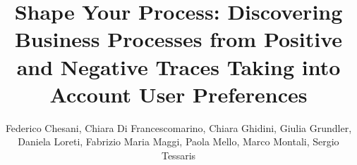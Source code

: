 \documentclass[runningheads]{llncs}
\begin{document}
%
\title{Shape Your Process: Discovering Business Processes from Positive and Negative Traces Taking into Account User Preferences}

%
%

\author{Federico Chesani, Chiara Di Francescomarino, Chiara Ghidini, Giulia Grundler, Daniela Loreti, Fabrizio Maria Maggi, Paola Mello, Marco Montali, Sergio Tessaris}

%
%
%
\maketitle              %
%
\end{document}
